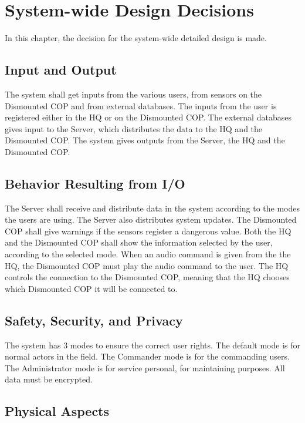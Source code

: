 \chapter{System-wide Design Decisions}

In this chapter, the decision for the system-wide detailed design is made.

\section{Input and Output}
The system shall get inputs from the various users, from sensors on the Dismounted COP and from external databases. The inputs from the user is registered either in the HQ or on the Dismounted COP. The external databases gives input to the Server, which distributes the data to the HQ and the Dismounted COP. The system gives outputs from the Server, the HQ and the Dismounted COP. 

\section{Behavior Resulting from I/O}
The Server shall receive and distribute data in the system according to the modes the users
are using. The Server also distributes system updates. The Dismounted COP shall give
warnings if the sensors register a dangerous value. Both the HQ and the Dismounted COP
shall show the information selected by the user, according to the selected mode. When
an audio command is given from the the HQ, the Dismounted COP must play the audio
command to the user. The HQ controls the connection to the Dismounted COP, meaning
that the HQ chooses which Dismounted COP it will be connected to.



\section{Safety, Security, and Privacy}
The system has 3 modes to ensure the correct user rights. The default mode is for normal actors in the field. The Commander mode is for the commanding users. The Administrator mode is for service personal, for maintaining purposes. All data must be encrypted. 

\section{Physical Aspects}

